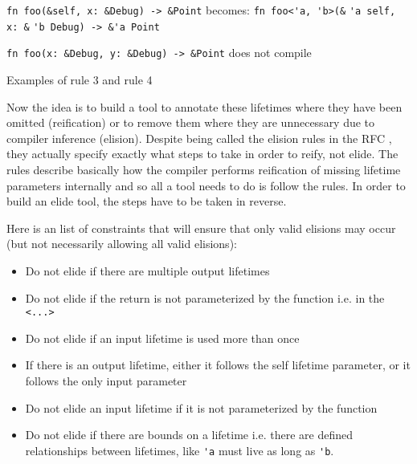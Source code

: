 \begin{fig}
{\verb|fn foo(&self, x: &Debug) -> &Point|}\newline
becomes: {\verb|fn foo<'a, 'b>(&|}
{\color{green} \verb|'a|}{\verb| self, x: &|}{\color{red} \verb|'b|}{\verb| Debug) -> &|}{\color{blue}\verb|'a|}{\verb| Point|}


\vspace{4mm}
{\verb|fn foo(x: &Debug, y: &Debug) -> &Point|}\newline
does not compile

\caption{Examples of rule 3 and rule 4}
\label{Fig:lifetimes4}
\end{fig}

Now the idea is to build a tool to annotate these lifetimes where they have been omitted (reification) or to remove them where they are unnecessary due to compiler inference (elision). Despite being called the elision rules in the RFC \cite{elisionrules}, they actually specify exactly what steps to take in order to reify, not elide. The rules describe basically how the compiler performs reification of missing lifetime parameters internally and so all a tool needs to do is follow the rules. In order to build an elide tool, the steps have to be taken in reverse.


Here is an list of constraints that will ensure that only valid elisions may occur (but not necessarily allowing all valid elisions):
\begin{itemize}
\item Do not elide if there are multiple output lifetimes
\item Do not elide if the return is not parameterized by the function i.e. in the {\verb|<...>|}
\item Do not elide if an input lifetime is used more than once
\item If there is an output lifetime, either it follows the self lifetime parameter, or it follows the only input parameter
\item Do not elide an input lifetime if it is not parameterized by the function
\item Do not elide if there are bounds on a lifetime i.e. there are defined relationships between lifetimes, like {\verb|'a|} must live as long as {\verb|'b|}.
\end{itemize}

